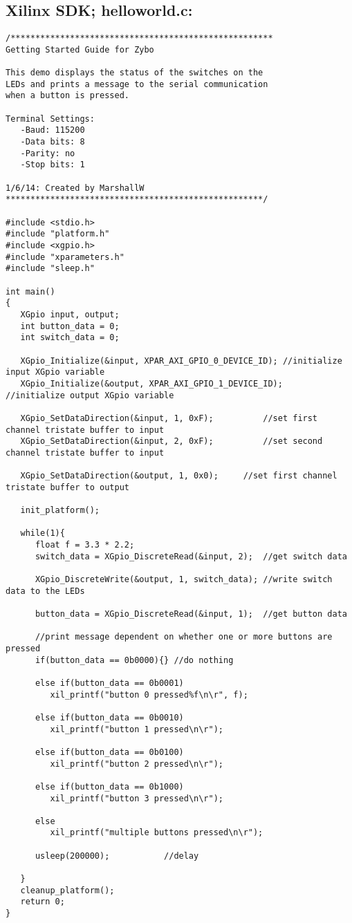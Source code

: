\subsection{Xilinx SDK; helloworld.c:}
\label{anhang:helloworld.c}
\lstset{language=c}
\begin{lstlisting}
/*****************************************************
Getting Started Guide for Zybo

This demo displays the status of the switches on the
LEDs and prints a message to the serial communication
when a button is pressed.

Terminal Settings:
   -Baud: 115200
   -Data bits: 8
   -Parity: no
   -Stop bits: 1

1/6/14: Created by MarshallW
****************************************************/

#include <stdio.h>
#include "platform.h"
#include <xgpio.h>
#include "xparameters.h"
#include "sleep.h"

int main()
{
   XGpio input, output;
   int button_data = 0;
   int switch_data = 0;

   XGpio_Initialize(&input, XPAR_AXI_GPIO_0_DEVICE_ID);	//initialize input XGpio variable
   XGpio_Initialize(&output, XPAR_AXI_GPIO_1_DEVICE_ID);	//initialize output XGpio variable

   XGpio_SetDataDirection(&input, 1, 0xF);			//set first channel tristate buffer to input
   XGpio_SetDataDirection(&input, 2, 0xF);			//set second channel tristate buffer to input

   XGpio_SetDataDirection(&output, 1, 0x0);		//set first channel tristate buffer to output

   init_platform();

   while(1){
	  float f = 3.3 * 2.2;
      switch_data = XGpio_DiscreteRead(&input, 2);	//get switch data

      XGpio_DiscreteWrite(&output, 1, switch_data);	//write switch data to the LEDs

      button_data = XGpio_DiscreteRead(&input, 1);	//get button data

      //print message dependent on whether one or more buttons are pressed
      if(button_data == 0b0000){} //do nothing

      else if(button_data == 0b0001)
         xil_printf("button 0 pressed%f\n\r", f);

      else if(button_data == 0b0010)
         xil_printf("button 1 pressed\n\r");

      else if(button_data == 0b0100)
         xil_printf("button 2 pressed\n\r");

      else if(button_data == 0b1000)
         xil_printf("button 3 pressed\n\r");

      else
         xil_printf("multiple buttons pressed\n\r");

      usleep(200000);			//delay

   }
   cleanup_platform();
   return 0;
}
\end{lstlisting}





